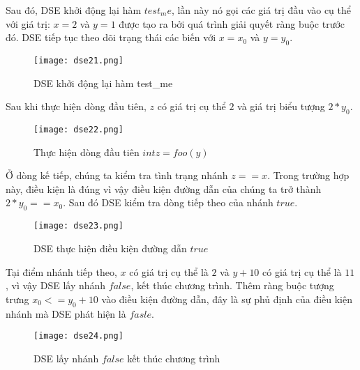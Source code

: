 Sau đó, DSE khởi động lại hàm $test_me$, lần này nó gọi các giá trị đầu vào cụ thể với giá trị: $x = 2$ và $y = 1$ được tạo ra bởi quá trình giải quyết ràng buộc trước đó. DSE tiếp tục theo dõi trạng thái các biến với $x = x_{0}$ và $y = y_{0}$.

\begin{center}
	\begin{figure}[H]
		\begin{center}
			\texttt{[image: dse21.png]}
		\end{center}
		\caption{DSE khởi động lại hàm test\_me}
		\label{dse21}
	\end{figure}
\end{center}

Sau khi thực hiện dòng đầu tiên, $z$ có giá trị cụ thể $2$ và giá trị biểu tượng $2*y_{0}$.

\begin{center}
	\begin{figure}[H]
		\begin{center}
			\texttt{[image: dse22.png]}
		\end{center}
		\caption{Thực hiện dòng đầu tiên $int z = foo(y)$}
		\label{dse22}
	\end{figure}
\end{center}

Ở dòng kế tiếp, chúng ta kiểm tra tình trạng nhánh $z == x$. Trong trường hợp này, điều kiện là đúng vì vậy điều kiện đường dẫn của chúng ta trở thành $2*y_{0} == x_{0}$. Sau đó DSE kiểm tra dòng tiếp theo của nhánh $true$.

\begin{center}
	\begin{figure}[H]
		\begin{center}
			\texttt{[image: dse23.png]}
		\end{center}
		\caption{DSE thực hiện điều kiện đường dẫn $true$}
		\label{dse23}
	\end{figure}
\end{center} 

Tại điểm nhánh tiếp theo, $x$ có giá trị cụ thể là $2$ và $y + 10$ có giá trị cụ thể là $11$, vì vậy DSE lấy nhánh $false$, kết thúc chương trình. Thêm ràng buộc tượng trưng $x_{0} <= y_{0} + 10$ vào điều kiện đường dẫn, đây là sự phủ định của điều kiện nhánh mà DSE phát hiện là $fasle$.

\begin{center}
	\begin{figure}[H]
		\begin{center}
			\texttt{[image: dse24.png]}
		\end{center}
		\caption{DSE lấy nhánh $false$ kết thúc chương trình}
		\label{dse24}
	\end{figure}
\end{center} 


